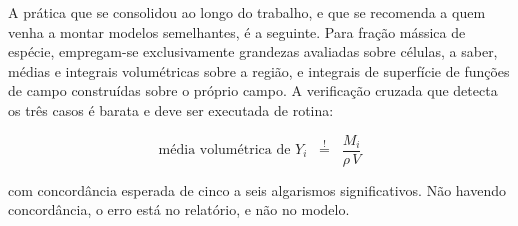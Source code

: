 A prática que se consolidou ao longo do trabalho, e que se recomenda a quem
venha a montar modelos semelhantes, é a seguinte. Para fração mássica de
espécie, empregam-se exclusivamente grandezas avaliadas sobre células, a saber,
médias e integrais volumétricas sobre a região, e integrais de superfície de
funções de campo construídas sobre o próprio campo. A verificação cruzada que
detecta os três casos é barata e deve ser executada de rotina:

\begin{equation}
\text{média volumétrica de } Y_i \;\;\stackrel{!}{=}\;\; \frac{M_i}{\rho\, V}
\label{eq:cruzada}
\end{equation}

\noindent
com concordância esperada de cinco a seis algarismos significativos. Não havendo
concordância, o erro está no relatório, e não no modelo.
